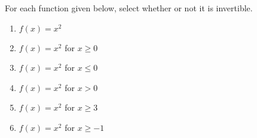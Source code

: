 \documentclass{ximera}
\author{Kenneth Berglund}
\begin{document}
\begin{exercise}
For each function given below, select whether or not it is invertible.
\begin{enumerate}
\item $f(x) = x^2$ 
\begin{multipleChoice}  
\end{multipleChoice} 

\item $f(x) = x^2$ for $x \ge 0$ 
\begin{multipleChoice}  
\end{multipleChoice} 

\item $f(x) = x^2$ for $x \le 0$ 
\begin{multipleChoice}  
\end{multipleChoice} 

\item $f(x) = x^2$ for $x > 0$ 
\begin{multipleChoice}  
\end{multipleChoice} 


\item $f(x) = x^2$ for $x \ge 3$ 
\begin{multipleChoice}  
\end{multipleChoice} 

\item $f(x) = x^2$ for $x \ge -1$ 
\begin{multipleChoice}  
\end{multipleChoice} 
\end{enumerate}
\end{exercise}
\end{document}
